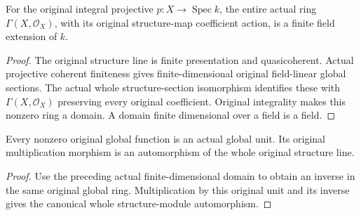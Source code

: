 \begin{lemma}
\label{lem:fc-original-projective-integral-global-functions}
\leanok
For the original integral projective $p:X\to\operatorname{Spec}k$, the
entire actual ring $\Gamma(X,\mathcal O_X)$, with its original
structure-map coefficient action, is a finite field extension of $k$.
\end{lemma}
\begin{proof}
The original structure line is finite presentation and quasicoherent.
Actual projective coherent finiteness gives finite-dimensional original
field-linear global sections.  The actual whole structure-section
isomorphism identifies these with $\Gamma(X,\mathcal O_X)$ preserving
every original coefficient.  Original integrality makes this nonzero
ring a domain.  A domain finite dimensional over a field is a field.
\end{proof}

\begin{lemma}
\label{lem:fc-original-projective-global-function-units}
\leanok
{}
Every nonzero original global function is an actual global unit.  Its
original multiplication morphism is an automorphism of the whole
original structure line.
\end{lemma}
\begin{proof}
Use the preceding actual finite-dimensional domain to obtain an inverse
in the same original global ring.  Multiplication by this original unit
and its inverse gives the canonical whole structure-module automorphism.
\end{proof}
